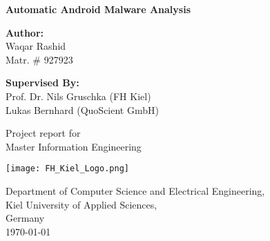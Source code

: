 \documentclass[../main.tex]{subfile}
\begin{document}



\begin{titlepage}
	\begin{center}
		\vspace*{3cm}
		
		\Huge
		\textbf{Automatic Android Malware Analysis}
		
		\vspace{0.5cm}
		\LARGE	
		\vspace{1.5cm}
		
		\textbf{Author:}\\
		Waqar Rashid\\
		Matr. \# 927923

		\vspace{1.5cm}
		\textbf{Supervised By:}\\
		Prof. Dr. Nils Gruschka (FH Kiel)\\
		Lukas Bernhard (QuoScient GmbH)
		
		
		\vfill
		
		Project report for \\
		Master Information Engineering
		
		\vspace{0.8cm}
		
		\texttt{[image: FH\_Kiel\_Logo.png]}
		
		\Large
		Department of Computer Science and Electrical Engineering,\\
		Kiel University of Applied Sciences,\\
		Germany\\
		\today
		
	\end{center}
\end{titlepage}
\end{document}
